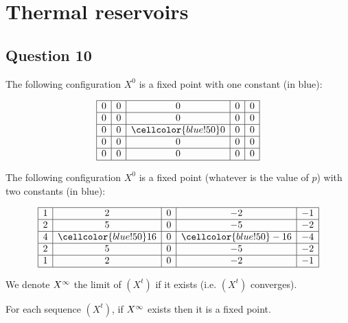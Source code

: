 \section{Thermal reservoirs}


\subsection*{Question 10}
 
\begin{ex}
  The following configuration $X^0$ is a fixed point with one constant (in blue):
  
  \[\begin{array}{ | c | c | c | c | c |} \hline
    0 & 0 & 0 & 0 & 0\\ \hline
    0 & 0 & 0 & 0 & 0\\ \hline
    0 & 0 & \cellcolor{blue!50} 0 & 0 & 0\\ \hline
    0 & 0 & 0 & 0 & 0\\ \hline
    0 & 0 & 0 & 0 & 0\\ \hline
  \end{array}\]
\end{ex}

\begin{ex}
  The following configuration $X^0$ is a fixed point (whatever is the value of $p$) with two constants (in blue):
  
  \[\begin{array}{ | c | c | c | c | c |} \hline
    1 & 2 & 0 & -2 & -1\\ \hline
    2 & 5 & 0 & -5 & -2\\ \hline
    4 & \cellcolor{blue!50} 16 & 0 & \cellcolor{blue!50}  -16 & -4\\ \hline
    2 & 5 & 0 & -5 & -2\\ \hline
    1 & 2 & 0 & -2 & -1\\ \hline
  \end{array}\]
\end{ex}


\begin{defi}
  We denote $X^{\infty}$ the limit of $(X^t)$ if it exists (i.e. $(X^t)$ converges).
\end{defi}

\begin{lemma}
 \label{fix}
 For each sequence $(X^t)$, if $X^{\infty}$ exists then it is a fixed point.
\end{lemma}

